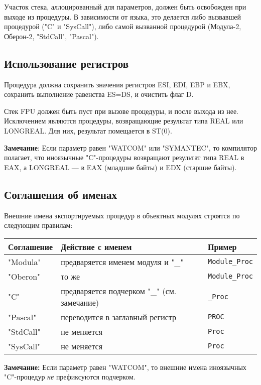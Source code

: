 Участок стека, аллоцированный для параметров, должен быть 
освобожден при выходе из процедуры. В зависимости от языка, это
делается либо вызвавшей процедурой
("C" и "SysCall"), либо самой вызванной процедурой (Модула-2, Оберон-2,
"StdCall", "Pascal").

\subsection{Использование регистров}

Процедура должна сохранить значения регистров ESI, EDI, EBP и EBX,
сохранить выполнение равенства ES=DS, и очистить флаг D.

Стек FPU должен быть пуст при вызове процедуры, и после выхода из нее.
Исключением являются процедуры, возвращающие результат типа REAL или
LONGREAL.  Для них, результат помещается в ST(0).

{\bf Замечание}: Если параметр  равен "WATCOM" или
"SYMANTEC", то компилятор полагает, что иноязычные "C"-процедуры
возвращают результат типа REAL в EAX, а LONGREAL --- в EAX
(младшие байты) и EDX (старшие байты).

\subsection{Соглашения об именах}

Внешние имена экспортируемых процедур в объектных модулях %
строятся по следующим правилам:

\begin{tabular}{lll}
\hline
\bf Соглашение & \bf Действие с именем & \bf Пример \\
\hline
"Modula"       & предваряется именем модуля и "\_" & \verb'Module_Proc' \\
"Oberon"       & то же                                 & \verb'Module_Proc' \\
"C"            & предваряется подчерком "\_" (см. замечание) & \verb'_Proc'       \\
"Pascal"       & переводится в заглавный регистр       & \verb'PROC'        \\
"StdCall"      & не меняется                             & \verb'Proc'        \\
"SysCall"      & не меняется                             & \verb'Proc'        \\
\hline
\end{tabular}

{\bf Замечание:} Если параметр  равен "WATCOM",
то внешние имена иноязычных "C"-процедур 
{\em не} префиксуются подчерком.

